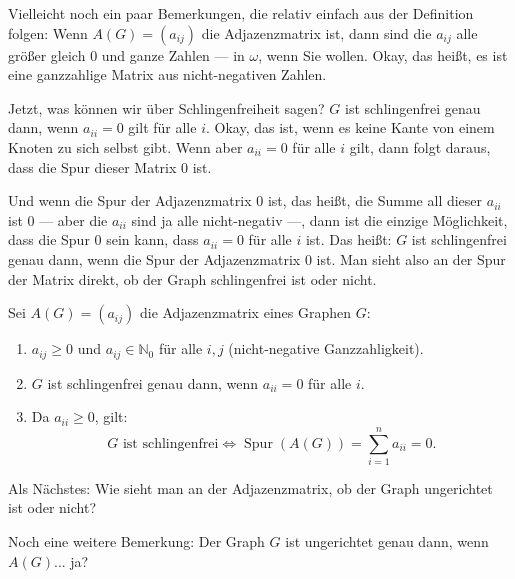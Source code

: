 \begin{spoken-clean}[00:37:48 - 00:39:45]
Vielleicht noch ein paar Bemerkungen, die relativ einfach aus der Definition folgen: Wenn $A(G) = (a_{ij})$ die Adjazenzmatrix ist, dann sind die $a_{ij}$ alle größer gleich $0$ und ganze Zahlen --- in $\omega$, wenn Sie wollen. Okay, das heißt, es ist eine ganzzahlige Matrix aus nicht-negativen Zahlen.

Jetzt, was können wir über Schlingenfreiheit sagen? $G$ ist schlingenfrei genau dann, wenn $a_{ii} = 0$ gilt für alle $i$. Okay, das ist, wenn es keine Kante von einem Knoten zu sich selbst gibt. Wenn aber $a_{ii} = 0$ für alle $i$ gilt, dann folgt daraus, dass die Spur dieser Matrix $0$ ist.

Und wenn die Spur der Adjazenzmatrix $0$ ist, das heißt, die Summe all dieser $a_{ii}$ ist $0$ --- aber die $a_{ii}$ sind ja alle nicht-negativ ---, dann ist die einzige Möglichkeit, dass die Spur $0$ sein kann, dass $a_{ii} = 0$ für alle $i$ ist. Das heißt: $G$ ist schlingenfrei genau dann, wenn die Spur der Adjazenzmatrix $0$ ist. Man sieht also an der Spur der Matrix direkt, ob der Graph schlingenfrei ist oder nicht.
\end{spoken-clean}

\begin{math-stroke}
\begin{remark}
Sei $A(G) = (a_{ij})$ die Adjazenzmatrix eines Graphen $G$:
\begin{enumerate}[label=\textbf{(\roman*)}]
    \item $a_{ij} \ge 0$ und $a_{ij} \in \mathbb{N}_0$ für alle $i, j$ (nicht-negative Ganzzahligkeit).
    \item $G$ ist schlingenfrei genau dann, wenn $a_{ii} = 0$ für alle $i$.
    \item Da $a_{ii} \ge 0$, gilt:
    \[
    G \text{ ist schlingenfrei} \iff \operatorname{Spur}(A(G)) = \sum_{i=1}^n a_{ii} = 0.
    \]
\end{enumerate}
\end{remark}
\end{math-stroke}

\begin{spoken-clean}[00:39:45 - 00:41:27]
Als Nächstes: Wie sieht man an der Adjazenzmatrix, ob der Graph ungerichtet ist oder nicht?

Noch eine weitere Bemerkung: Der Graph $G$ ist ungerichtet genau dann, wenn $A(G)$... ja?
\end{spoken-clean}


